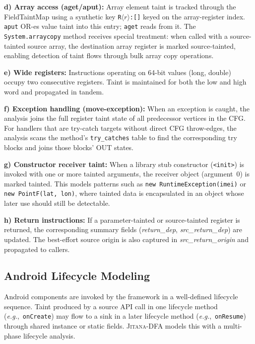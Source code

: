 \documentclass[conference]{IEEEtran}
\begin{document}
\textbf{d) Array access (aget/aput):} Array element taint is tracked through
the FieldTaintMap using a synthetic key \texttt{R$\langle r\rangle$:[]} keyed on
the array-register index. \texttt{aput} OR-es value taint into this entry;
\texttt{aget} reads from it. The \texttt{System.arraycopy} method receives
special treatment: when called with a source-tainted source array, the
destination array register is marked source-tainted, enabling detection of taint
flows through bulk array copy operations.

\textbf{e) Wide registers:} Instructions operating on 64-bit values (long,
double) occupy two consecutive registers. Taint is maintained for both the low
and high word and propagated in tandem.

\textbf{f) Exception handling (move-exception):} When an exception is caught,
the analysis joins the full register taint state of all predecessor vertices in
the CFG. For handlers that are try-catch targets without direct CFG throw-edges,
the analysis scans the method's \texttt{try\_catches} table to find the
corresponding try blocks and joins those blocks' OUT states.

\textbf{g) Constructor receiver taint:} When a library stub constructor
(\texttt{<init>}) is invoked with one or more tainted arguments, the receiver
object (argument~0) is marked tainted. This models patterns such as \texttt{new
RuntimeException(imei)} or \texttt{new PointF(lat, lon)}, where tainted data is
encapsulated in an object whose later use should still be detectable.

\textbf{h) Return instructions:} If a parameter-tainted or source-tainted
register is returned, the corresponding summary fields (\emph{return\_dep},
\emph{src\_return\_dep}) are updated. The best-effort source origin is also
captured in \emph{src\_return\_origin} and propagated to callers.

\subsection{Android Lifecycle Modeling}

Android components are invoked by the framework in a well-defined lifecycle
sequence. Taint produced by a source API call in one lifecycle method
(\textit{e.g.},~\texttt{onCreate}) may flow to a sink in a later lifecycle
method (\textit{e.g.},~\texttt{onResume}) through shared instance or static
fields. \textsc{Jitana-DFA} models this with a multi-phase lifecycle analysis.
\end{document}
